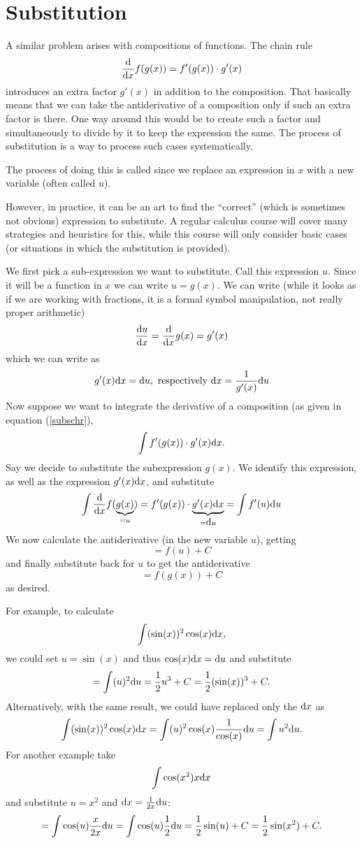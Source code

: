 \section{Substitution}

A similar problem arises with compositions of functions. The chain rule
\begin{equation}
\frac{\mbox{d}}{\mbox{d}x} f(g(x))=f'(g(x))\cdot g'(x)
\label{subschr}
\end{equation}
introduces an extra factor $g'(x)$ in addition to the composition. That
basically means that we can take the antiderivative of a composition only if
such an extra factor is there.  One way around this would be to create such
a factor and simultaneously to divide by it to keep the expression the same.
The process of substitution is a way to process such cases systematically.

The process of doing this is called  since we replace
an expression in $x$ with a new variable (often called $u$).

However, in practice, it can be an art to
find the ``correct'' (which is sometimes not obvious) expression to substitute. A
regular calculus course will cover many strategies and heuristics for this,
while this course will only consider basic cases (or situations in which the
substitution is provided).

We first pick a sub-expression we want to substitute. Call this expression
$u$. Since it will be a function in $x$ we can write $u=g(x)$. We can write
(while it looks as if we are working with fractions, it is a formal symbol
manipulation, not really proper arithmetic)
\[
\frac{{\mbox{d}}u}{{\mbox{d}}x}=\frac{\mbox{d}}{\mbox{d}x} g(x)=g'(x)
\]
which we can write as
\[
g'(x){\mbox{d}}x={\mbox{d}}u,\mbox{\ respectively\ } {\mbox{d}}x=\frac{1}{g'(x)}{\mbox{d}}u
\]
Now suppose we want to integrate the derivative of a composition (as given
in equation (\ref{subschr}),
\[
\int f'(g(x))\cdot g'(x){\mbox{d}}x.
\]
Say we decide to substitute the subexpression $g(x)$. We identify this
expression, as well as the expression $g'(x){\mbox{d}}x$, and substitute
\[
\int \frac{\mbox{d}}{\mbox{d}x} f(\underbrace{g(x)}_{=u})=f'(g(x))\cdot
\underbrace{g'(x){\mbox{d}}x}_{={\mbox{d}}u}=\int f'(u){\mbox{d}}u
\]
We now calculate the antiderivative (in the new variable $u$), getting
\[
=f(u)+C
\]
and finally substitute back for $u$ to get the antiderivative
\[
=f(g(x))+C
\]
as desired.

For example, to calculate
\[
\int (\sin(x))^2\cos(x){\mbox{d}}x,
\]
we could set $u=\sin(x)$ and thus $\cos(x){\mbox{d}}x={\mbox{d}}u$ and substitute
\[
=\int (u)^2{\mbox{d}}u=\frac12 u^3+C=\frac12 (\sin(x))^3+C.
\]
Alternatively, with the same result, we could have replaced only the ${\mbox{d}}x$ as
\[
\int (\sin(x))^2\cos(x){\mbox{d}}x=\int (u)^2\cos(x)\frac{1}{\cos(x)}{\mbox{d}}u=\int
u^2{\mbox{d}}u.
\]
For another example take
\[
\int \cos(x^2)x{\mbox{d}}x
\]
and substitute $u=x^2$ and ${\mbox{d}}x=\frac{1}{2x}{\mbox{d}}u$:
\[
=\int \cos(u)\frac{x}{2x}{\mbox{d}}u
=\int \cos(u)\frac{1}{2}{\mbox{d}}u=\frac12\sin(u)+C=\frac12\sin(x^2)+C.
\]
\smallskip

